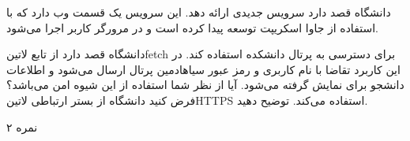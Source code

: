 \documentclass[../main.tex]{subfiles}
\begin{document}

دانشگاه قصد دارد سرویس جدیدی ارائه دهد.
این سرویس یک قسمت وب دارد که با استفاده از جاوا اسکریپت توسعه پیدا
کرده است و در مرورگر کاربر اجرا می‌شود.

دانشگاه قصد دارد از تابع ‌لاتین{fetch} برای دسترسی به پرتال دانشکده استفاده کند.
در این کاربرد تقاضا با نام کاربری و رمز عبور ‌سیاه{ادمین} پرتال ارسال می‌شود و اطلاعات دانشجو برای نمایش گرفته می‌شود.
آیا از نظر شما استفاده از این شیوه امن می‌باشد؟ فرض کنید دانشگاه از بستر ارتباطی ‌لاتین{HTTPS} استفاده می‌کند.
توضیح دهید.

۲ نمره

\end{document}
